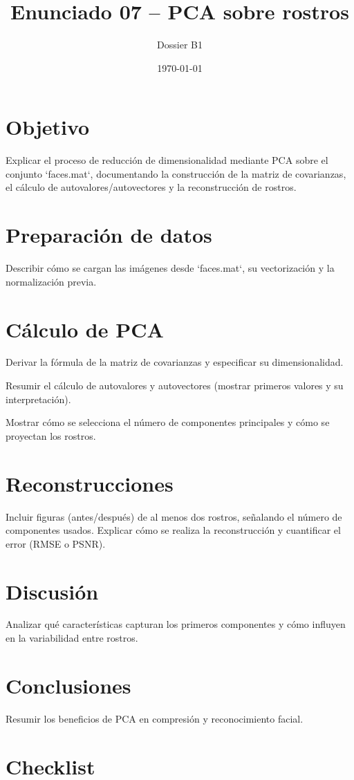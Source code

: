 \documentclass[12pt]{article}
\title{Enunciado 07 -- PCA sobre rostros}
\author{Dossier B1}
\date{\today}
\begin{document}
\maketitle
\section{Objetivo}
Explicar el proceso de reducción de dimensionalidad mediante PCA sobre el conjunto `faces.mat`, documentando la construcción de la matriz de covarianzas, el cálculo de autovalores/autovectores y la reconstrucción de rostros.

\section{Preparación de datos}
Describir cómo se cargan las imágenes desde `faces.mat`, su vectorización y la normalización previa.

\section{Cálculo de PCA}
\begin{pasoapaso}
  \item Derivar la fórmula de la matriz de covarianzas y especificar su dimensionalidad.
  \item Resumir el cálculo de autovalores y autovectores (mostrar primeros valores y su interpretación).
  \item Mostrar cómo se selecciona el número de componentes principales y cómo se proyectan los rostros.
\end{pasoapaso}

\section{Reconstrucciones}
Incluir figuras (antes/después) de al menos dos rostros, señalando el número de componentes usados. Explicar cómo se realiza la reconstrucción y cuantificar el error (RMSE o PSNR).

\section{Discusión}
Analizar qué características capturan los primeros componentes y cómo influyen en la variabilidad entre rostros.

\section{Conclusiones}
Resumir los beneficios de PCA en compresión y reconocimiento facial.

\section*{Checklist}
\ChecklistBase
\end{document}
